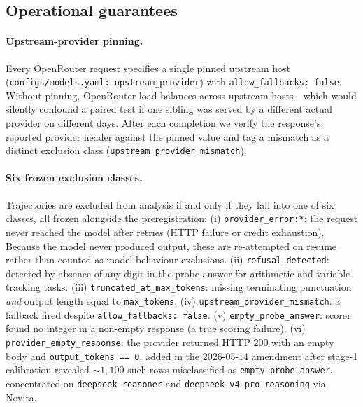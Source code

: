 \subsection{Operational guarantees}
\label{sec:method:ops}

\paragraph{Upstream-provider pinning.}
Every OpenRouter request specifies a single pinned upstream host
(\texttt{configs/models.yaml: upstream\_provider}) with
\texttt{allow\_fallbacks: false}. Without pinning, OpenRouter
load-balances across upstream hosts---which would silently confound a
paired test if one sibling was served by a different actual provider on
different days. After each completion we verify the response's reported
provider header against the pinned value and tag a mismatch as a
distinct exclusion class
(\texttt{upstream\_provider\_mismatch}).

\paragraph{Six frozen exclusion classes.}
Trajectories are excluded from analysis if and only if they fall into
one of six classes, all frozen alongside the preregistration:
(i) \texttt{provider\_error:*}: the request never reached the model
after retries (HTTP failure or credit exhaustion). Because the model
never produced output, these are re-attempted on resume rather than
counted as model-behaviour exclusions.
(ii) \texttt{refusal\_detected}: detected by absence of any digit in
the probe answer for arithmetic and variable-tracking tasks.
(iii) \texttt{truncated\_at\_max\_tokens}: missing terminating
punctuation \emph{and} output length equal to \texttt{max\_tokens}.
(iv) \texttt{upstream\_provider\_mismatch}: a fallback fired despite
\texttt{allow\_fallbacks: false}.
(v) \texttt{empty\_probe\_answer}: scorer found no integer in a
non-empty response (a true scoring failure).
(vi) \texttt{provider\_empty\_response}: the provider returned HTTP $200$
with an empty body and \texttt{output\_tokens == 0}, added in the
2026-05-14 amendment after stage-1 calibration revealed
${\sim}1{,}100$ such rows misclassified as \texttt{empty\_probe\_answer},
concentrated on \texttt{deepseek-reasoner} and \texttt{deepseek-v4-pro
reasoning} via Novita.

